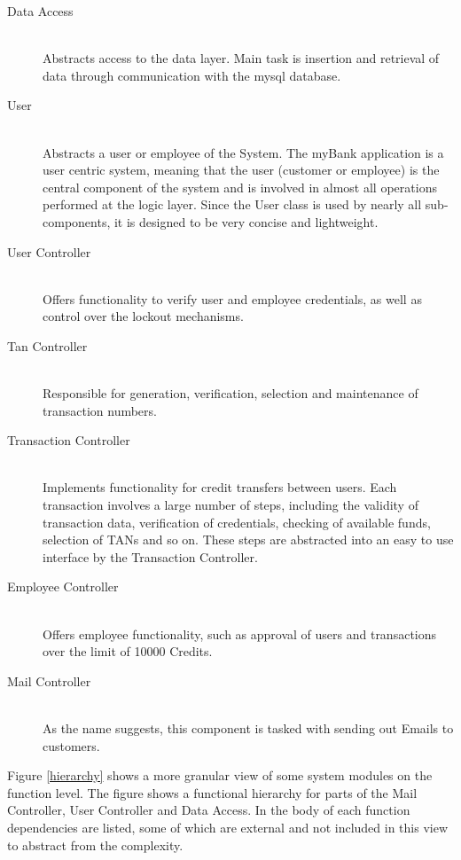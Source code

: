 \begin{description}
  \item[Data Access] \hfill \\
  Abstracts access to the data layer. Main task is insertion and retrieval of data through communication with the mysql database.
  \item[User] \hfill \\
  Abstracts a user or employee of the System. The myBank application is a user centric system, meaning that the user (customer or employee) is the central component of the system and is involved in almost all operations performed at the logic layer. Since the User class is used by nearly all sub-components, it is designed to be very concise and lightweight.
  \item[User Controller] \hfill \\
  Offers functionality to verify user and employee credentials, as well as control over the lockout mechanisms.
  \item[Tan Controller] \hfill \\
  Responsible for generation, verification, selection and maintenance of transaction numbers.
  \item[Transaction Controller] \hfill \\
  Implements functionality for credit transfers between users. Each transaction involves a large number of steps, including the validity of transaction data, verification of credentials, checking of available funds, selection of TANs and so on. These steps are abstracted into an easy to use interface by the Transaction Controller.
  \item[Employee Controller] \hfill \\
  Offers employee functionality, such as approval of users and transactions over the limit of 10000 Credits.
  \item[Mail Controller] \hfill \\
  As the name suggests, this component is tasked with sending out Emails to customers.
\end{description}
Figure \ref{hierarchy} shows a more granular view of some system modules on the function level. The figure shows a functional hierarchy for parts of the Mail Controller, User Controller and Data Access. In the body of each function dependencies are listed, some of which are external and not included in this view to abstract from the complexity.
